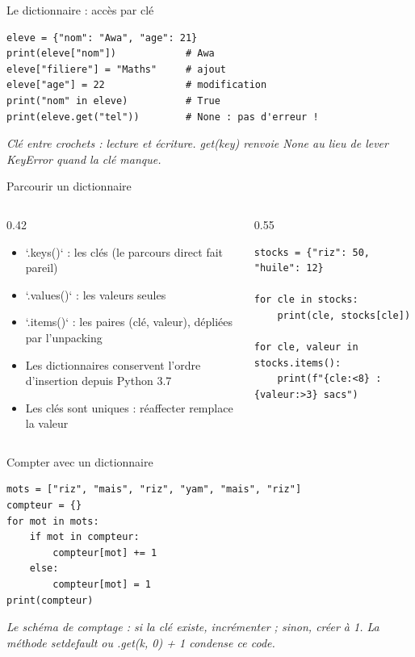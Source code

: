 \documentclass[aspectratio=169,11pt]{beamer}
\begin{document}
\begin{frame}[fragile]{Le dictionnaire : accès par clé}

\begin{lstlisting}[style=py]
eleve = {"nom": "Awa", "age": 21}
print(eleve["nom"])            # Awa
eleve["filiere"] = "Maths"     # ajout
eleve["age"] = 22              # modification
print("nom" in eleve)          # True
print(eleve.get("tel"))        # None : pas d'erreur !
\end{lstlisting}
\vspace{0.5pt}

{\small\color{PyGris}\itshape Clé entre crochets : lecture et écriture. get(key) renvoie None au lieu de lever KeyError quand la clé manque.}

\end{frame}

\begin{frame}[fragile]{Parcourir un dictionnaire}
\begin{columns}[t]
\begin{column}{0.42\textwidth}
\begin{itemize}
  \setlength{\itemsep}{1.5pt}\setlength{\parskip}{0pt}
  \item `.keys()` : les clés (le parcours direct fait pareil)
  \item `.values()` : les valeurs seules
  \item `.items()` : les paires (clé, valeur), dépliées par l'unpacking
  \item Les dictionnaires conservent l'ordre d'insertion depuis Python 3.7
  \item Les clés sont uniques : réaffecter remplace la valeur
\end{itemize}
\end{column}
\hspace{0.02\textwidth}
\begin{column}{0.55\textwidth}
\begin{lstlisting}[style=pysmall]
stocks = {"riz": 50, "huile": 12}

for cle in stocks:
    print(cle, stocks[cle])

for cle, valeur in stocks.items():
    print(f"{cle:<8} : {valeur:>3} sacs")
\end{lstlisting}
\end{column}
\end{columns}
\end{frame}

\begin{frame}[fragile]{Compter avec un dictionnaire}

\begin{lstlisting}[style=py]
mots = ["riz", "mais", "riz", "yam", "mais", "riz"]
compteur = {}
for mot in mots:
    if mot in compteur:
        compteur[mot] += 1
    else:
        compteur[mot] = 1
print(compteur)
\end{lstlisting}
\vspace{0.5pt}

{\small\color{PyGris}\itshape Le schéma de comptage : si la clé existe, incrémenter ; sinon, créer à 1. La méthode setdefault ou .get(k, 0) + 1 condense ce code.}

\end{frame}
\end{document}
